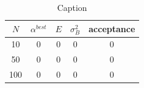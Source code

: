 \begin{table}[H]
    \centering
    \begin{tabular}{c|c|c|c|c}
            $N$ & $\alpha^{best}$ & $E$ & $\sigma^2_B$ & acceptance \\
            \hline
            10 & $0$ & $0$ & $0$ & $0$ \\
            50 & $0$ & $0$ & $0$ & $0$ \\
            100 & $0$ & $0$ & $0$ & $0$ \\
            \hline
        \end{tabular}
    \caption{Caption}
    \label{tab:optimal_alpha}
\end{table}